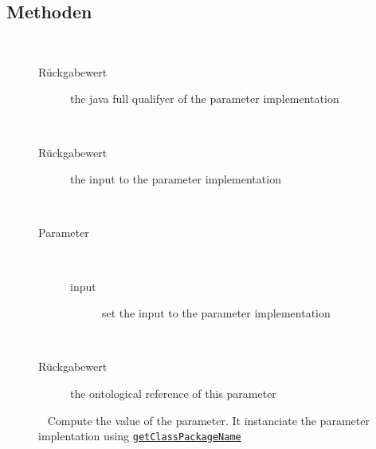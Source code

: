 \subsection{Methoden}
\begin{description}
\item[{\label{ontologyFramework.OFEventManagement.OFEventParameterDefinition.getClassPackageName()}}]
~ 
\begin{description}
\item[Rückgabewert] 
the java full qualifyer of the parameter implementation
\end{description}
\item[{\label{ontologyFramework.OFEventManagement.OFEventParameterDefinition.getInput()}}]
~ 
\begin{description}
\item[Rückgabewert] 
the input to the parameter implementation
\end{description}
\item[{\label{ontologyFramework.OFEventManagement.OFEventParameterDefinition.setInput(java.lang.Object)}}]
~ 
\begin{description}
\item[Parameter] ~
\begin{description}
\item[input]
set the input to the parameter implementation
\end{description}
\end{description}
\item[{\label{ontologyFramework.OFEventManagement.OFEventParameterDefinition.getOWLReferences()}}]
~ 
\begin{description}
\item[Rückgabewert] 
the ontological reference of this parameter
\end{description}
\item[{\label{ontologyFramework.OFEventManagement.OFEventParameterDefinition.getParameter()}}]
~ Compute the value of the parameter. It instanciate the parameter implentation using \texttt{\hyperlink{ontologyFramework.OFEventManagement.OFEventParameterDefinition.getClassPackageName()}{getClassPackageName}}

\end{description}
